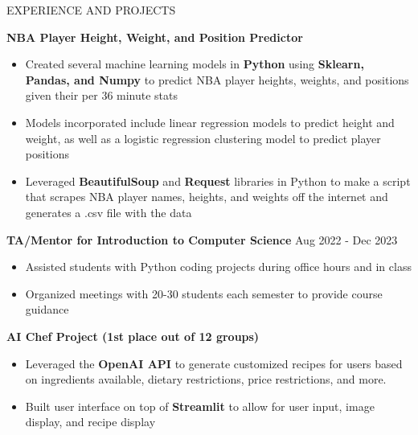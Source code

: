 \documentclass{resume} %
\begin{document}
\begin{rSection}{EXPERIENCE AND PROJECTS}


\item \textbf{NBA Player Height, Weight, and Position Predictor} %
\vspace{-6pt}
 \begin{itemize}
    \itemsep -6pt {} 
     \item Created several machine learning models in \textbf{Python} using \textbf{Sklearn, Pandas, and Numpy} to predict NBA player heights, weights, and positions given their per 36 minute stats
     \item Models incorporated include linear regression models to predict height and weight, as well as a logistic regression clustering model to predict player positions
    \item Leveraged \textbf{BeautifulSoup} and \textbf{Request} libraries in Python to make a script that scrapes NBA player names, heights, and weights off the internet and generates a .csv file with the data
 \end{itemize}



 \textbf{TA/Mentor for Introduction to Computer Science} \hfill Aug 2022 - Dec 2023%
\vspace{-6pt}
 \begin{itemize}
    \itemsep -6pt {} 
     \item Assisted students with Python coding projects during office hours and in class
     \item Organized meetings with 20-30 students each semester to provide course guidance
 \end{itemize}

 \textbf{AI Chef Project (1st place out of 12 groups)} \hfill %
\vspace{-6pt}
 \begin{itemize}
    \itemsep -6pt {} 
     \item Leveraged the \textbf{OpenAI API} to generate customized recipes for users based on ingredients available, dietary restrictions, price restrictions, and more.
     \item Built user interface on top of \textbf{Streamlit} to allow for user input, image display, and recipe display
 \end{itemize}
 

\end{rSection}
\end{document}
